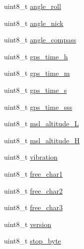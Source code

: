 \begin{DoxyCompactItemize}
\item 
uint8\+\_\+t \hyperlink{structHOTT__GPS__MSG__s_aeec9fc4002379970483db38168dbe66a}{angle\+\_\+roll}
\item 
uint8\+\_\+t \hyperlink{structHOTT__GPS__MSG__s_a69c0c2a259cb0b969c12bd1df07df7e9}{angle\+\_\+nick}
\item 
uint8\+\_\+t \hyperlink{structHOTT__GPS__MSG__s_a772744f2be54b7dcc70de2d7d0329c5e}{angle\+\_\+compass}
\item 
uint8\+\_\+t \hyperlink{structHOTT__GPS__MSG__s_a81acb24a6ea9d539a695caea0d427a12}{gps\+\_\+time\+\_\+h}
\item 
uint8\+\_\+t \hyperlink{structHOTT__GPS__MSG__s_afc04b9c5938e8720e936c3a418b5333f}{gps\+\_\+time\+\_\+m}
\item 
uint8\+\_\+t \hyperlink{structHOTT__GPS__MSG__s_a55b4bc36ee8dbe6546c8e8297bbbce1f}{gps\+\_\+time\+\_\+s}
\item 
uint8\+\_\+t \hyperlink{structHOTT__GPS__MSG__s_a5c87e5f1076d91213d90a0b8bedf9423}{gps\+\_\+time\+\_\+sss}
\item 
uint8\+\_\+t \hyperlink{structHOTT__GPS__MSG__s_a792ea4341be990db52e7cf16e7058941}{msl\+\_\+altitude\+\_\+\+L}
\item 
uint8\+\_\+t \hyperlink{structHOTT__GPS__MSG__s_a3a60233e87b67134b3de5b25e8fdb936}{msl\+\_\+altitude\+\_\+\+H}
\item 
uint8\+\_\+t \hyperlink{structHOTT__GPS__MSG__s_aa78f346e11e432c608b43b034a7adb68}{vibration}
\item 
uint8\+\_\+t \hyperlink{structHOTT__GPS__MSG__s_ab16553d087db604ae9fd381ad6f9935f}{free\+\_\+char1}
\item 
uint8\+\_\+t \hyperlink{structHOTT__GPS__MSG__s_a17b2436dd58bff122bdfd13bb713f89b}{free\+\_\+char2}
\item 
uint8\+\_\+t \hyperlink{structHOTT__GPS__MSG__s_a1a4a1f6ccd4e00bade5ef61ed29cf40e}{free\+\_\+char3}
\item 
uint8\+\_\+t \hyperlink{structHOTT__GPS__MSG__s_a0dd93108c32dafa5eb0b01f10be0730f}{version}
\item 
uint8\+\_\+t \hyperlink{structHOTT__GPS__MSG__s_ab16a226b57f7ec4143cfd4b76dda7c90}{stop\+\_\+byte}
\end{DoxyCompactItemize}



